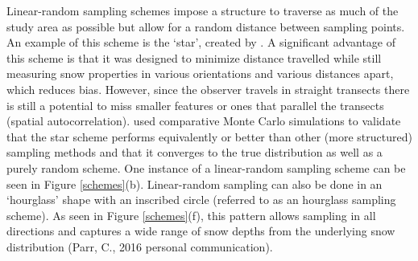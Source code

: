 \documentclass{sfuthesis}
\begin{document}
Linear-random sampling schemes impose a structure to traverse as much of the study area as possible but allow for a random distance between sampling points. An example of this scheme is the `star', created by \cite{Shea2010}. A significant advantage of this scheme is that it was designed to minimize distance travelled while still measuring snow properties in various orientations and various distances apart, which reduces bias. However, since the observer travels in straight transects there is still a potential to miss smaller features or ones that parallel the transects (spatial autocorrelation). \cite{Shea2010} used comparative Monte Carlo simulations to validate that the star scheme performs equivalently or better than other (more structured) sampling methods and that it converges to the true distribution as well as a purely random scheme. One instance of a linear-random sampling scheme can be seen in Figure \ref{schemes}(b). Linear-random sampling can also be done in an `hourglass' shape with an inscribed circle (referred to as an hourglass sampling scheme). As seen in Figure \ref{schemes}(f), this pattern allows sampling in all directions and captures a wide range of snow depths from the underlying snow distribution (Parr, C., 2016 personal communication).
\end{document}
